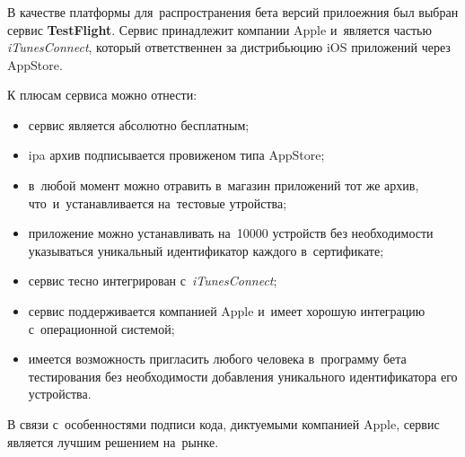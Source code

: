 \subsubsection{}
\label{sec:testing:ci:testflight}

В качестве платформы для~распространения бета версий прилоежния был выбран сервис \textbf{TestFlight}. Сервис принадлежит компании Apple и~является частью \textit{iTunesConnect}, который ответственнен за дистрибьюцию iOS приложений через AppStore.

К плюсам сервиса можно отнести:

\begin{itemize}
	\item сервис является абсолютно бесплатным;
	\item ipa архив подписывается провиженом типа AppStore;
	\item в~любой момент можно отравить в~магазин приложений тот же архив, что~и~устанавливается на~тестовые утройства;
	\item приложение можно устанавливать на~\num{10000} устройств без необходимости указываться уникальный идентификатор каждого в~сертификате;
	\item сервис тесно интегрирован с~\textit{iTunesConnect};
	\item сервис поддерживается компанией Apple и~имеет хорошую интеграцию с~операционной системой;
	\item имеется возможность пригласить любого человека в~программу бета тестирования без необходимости добавления уникального идентификатора его устройства.
\end{itemize}

В связи с~особенностями подписи кода, диктуемыми компанией Apple, сервис является лучшим решением на~рынке.
